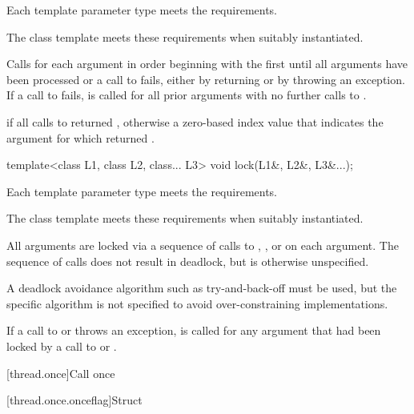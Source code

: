 \begin{itemdescr}
\pnum
\expects
Each template parameter type meets the  requirements.
\begin{note}
The
 class template meets these requirements when suitably instantiated.
\end{note}

\pnum
\effects
Calls  for each argument in order beginning with the
first until all arguments have been processed or a call to  fails,
either by returning  or by throwing an exception. If a call to
 fails,  is called for all prior arguments
with no further calls to .

\pnum
\returns
{} if all calls to  returned ,
otherwise a zero-based index value that indicates the argument for which 
returned .
\end{itemdescr}

%
\begin{itemdecl}
template<class L1, class L2, class... L3> void lock(L1&, L2&, L3&...);
\end{itemdecl}

\begin{itemdescr}
\pnum
\expects
Each template parameter type meets the  requirements.
\begin{note}
The
 class template meets these requirements when suitably instantiated.
\end{note}

\pnum
\effects
All arguments are locked via a sequence of calls to ,
, or  on each argument. The sequence of calls does
not result in deadlock, but is otherwise unspecified.
\begin{note}
A deadlock avoidance
algorithm such as try-and-back-off must be used, but the specific algorithm is not
specified to avoid over-constraining implementations.
\end{note}
If a call to
 or  throws an exception,  is
called for any argument that had been locked by a call to  or
.
\end{itemdescr}

[thread.once]{Call once}

[thread.once.onceflag]{Struct }

